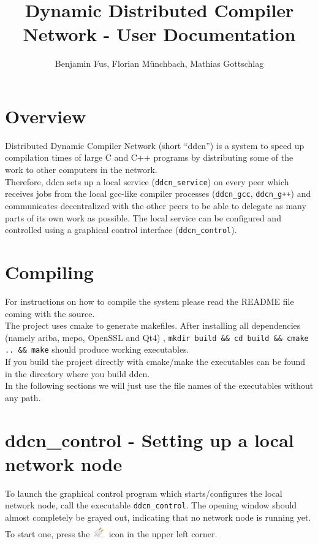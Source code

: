 \documentclass[a4paper,9pt]{scrartcl}
\title{Dynamic Distributed Compiler Network - User Documentation}
\author{Benjamin Fus, Florian Münchbach, Mathias Gottschlag}
\begin{document}
\maketitle

\section{Overview}

Distributed Dynamic Compiler Network (short ``ddcn'') is a system to speed up compilation times of large C and C++ programs by distributing some of the work to other computers in the network.\\Therefore, ddcn sets up a local service (\texttt{ddcn\_service}) on every peer which receives jobs from the local gcc-like compiler processes (\texttt{ddcn\_gcc}, \texttt{ddcn\_g++}) and communicates decentralized with the other peers to be able to delegate as many parts of its own work as possible. The local service can be configured and controlled using a graphical control interface (\texttt{ddcn\_control}).

\section{Compiling}

For instructions on how to compile the system please read the README file coming with the source.\\The project uses cmake to generate makefiles. After installing all dependencies (namely ariba, mcpo, OpenSSL and Qt4)
, \texttt{mkdir build \&\& cd build \&\& cmake .. \&\& make} should produce working executables.\\
If you build the project directly with cmake/make the executables can be found in the directory where you build ddcn.\\
In the following sections we will just use the file names of the executables without any path.

\section{ddcn\_control - Setting up a local network node}

To launch the graphical control program which starts/configures the local network node, call the executable \texttt{ddcn\_control}. The opening window should almost completely be grayed out, indicating that no network node is running yet. To start one, press the 
\includegraphics[scale=0.1,keepaspectratio=true]{../ddcn_control/icons/network-disconnect.png} icon in the upper left corner.\\
\smallskip
\end{document}
